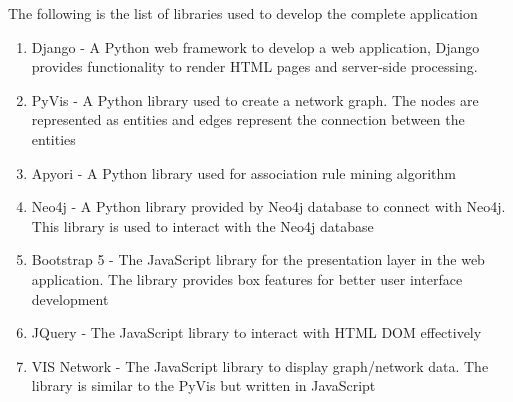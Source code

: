 \documentclass{article}
\begin{document}
The following is the list of libraries used to develop the complete application

\begin{enumerate}
    \item Django - A Python web framework to develop a web application, Django provides functionality to render HTML pages and server-side processing.
    \item PyVis - A Python library used to create a network graph. The nodes are represented as entities and edges represent the connection between the entities
    \item Apyori - A Python library used for association rule mining algorithm
    \item Neo4j - A Python library provided by Neo4j database to connect with Neo4j. This library is used to interact with the Neo4j database
    \item Bootstrap 5 - The JavaScript library for the presentation layer in the web application. The library provides box features for better user interface development
    \item JQuery - The JavaScript library to interact with HTML DOM effectively
    \item VIS Network - The JavaScript library to display graph/network data. The library is similar to the PyVis but written in JavaScript
\end{enumerate}
\end{document}

